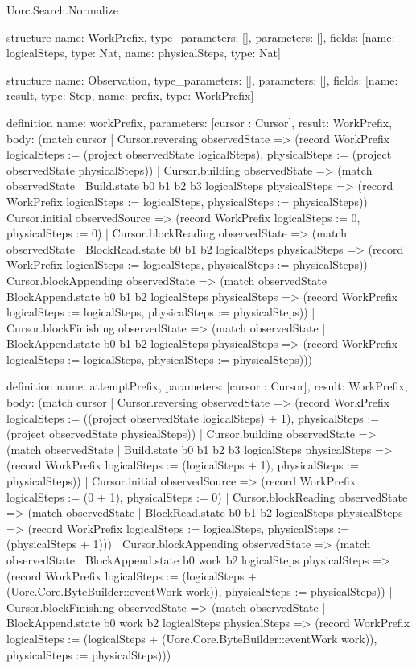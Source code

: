 \begin{lexlean}{Uorc.Search.Normalize}
\begin{semanticmodule}
structure{
  name: WorkPrefix,
  type_parameters: [],
  parameters: [],
  fields: [{name: logicalSteps, type: Nat}, {name: physicalSteps, type: Nat}]
}

structure{
  name: Observation,
  type_parameters: [],
  parameters: [],
  fields: [{name: result, type: Step}, {name: prefix, type: WorkPrefix}]
}

definition{
  name: workPrefix,
  parameters: [cursor : Cursor],
  result: WorkPrefix,
  body: (match cursor
    | Cursor.reversing observedState => (record WorkPrefix {logicalSteps := (project observedState logicalSteps), physicalSteps := (project observedState physicalSteps)})
    | Cursor.building observedState => (match observedState
      | Build.state b0 b1 b2 b3 logicalSteps physicalSteps => (record WorkPrefix {logicalSteps := logicalSteps, physicalSteps := physicalSteps}))
    | Cursor.initial observedSource => (record WorkPrefix {logicalSteps := 0, physicalSteps := 0})
    | Cursor.blockReading observedState => (match observedState
      | BlockRead.state b0 b1 b2 logicalSteps physicalSteps => (record WorkPrefix {logicalSteps := logicalSteps, physicalSteps := physicalSteps}))
    | Cursor.blockAppending observedState => (match observedState
      | BlockAppend.state b0 b1 b2 logicalSteps physicalSteps => (record WorkPrefix {logicalSteps := logicalSteps, physicalSteps := physicalSteps}))
    | Cursor.blockFinishing observedState => (match observedState
      | BlockAppend.state b0 b1 b2 logicalSteps physicalSteps => (record WorkPrefix {logicalSteps := logicalSteps, physicalSteps := physicalSteps})))
}

definition{
  name: attemptPrefix,
  parameters: [cursor : Cursor],
  result: WorkPrefix,
  body: (match cursor
    | Cursor.reversing observedState => (record WorkPrefix {logicalSteps := ((project observedState logicalSteps) + 1), physicalSteps := (project observedState physicalSteps)})
    | Cursor.building observedState => (match observedState
      | Build.state b0 b1 b2 b3 logicalSteps physicalSteps => (record WorkPrefix {logicalSteps := (logicalSteps + 1), physicalSteps := physicalSteps}))
    | Cursor.initial observedSource => (record WorkPrefix {logicalSteps := (0 + 1), physicalSteps := 0})
    | Cursor.blockReading observedState => (match observedState
      | BlockRead.state b0 b1 b2 logicalSteps physicalSteps => (record WorkPrefix {logicalSteps := logicalSteps, physicalSteps := (physicalSteps + 1)}))
    | Cursor.blockAppending observedState => (match observedState
      | BlockAppend.state b0 work b2 logicalSteps physicalSteps => (record WorkPrefix {logicalSteps := (logicalSteps + (Uorc.Core.ByteBuilder::eventWork work)), physicalSteps := physicalSteps}))
    | Cursor.blockFinishing observedState => (match observedState
      | BlockAppend.state b0 work b2 logicalSteps physicalSteps => (record WorkPrefix {logicalSteps := (logicalSteps + (Uorc.Core.ByteBuilder::eventWork work)), physicalSteps := physicalSteps})))
}


\end{semanticmodule}
\end{lexlean}

